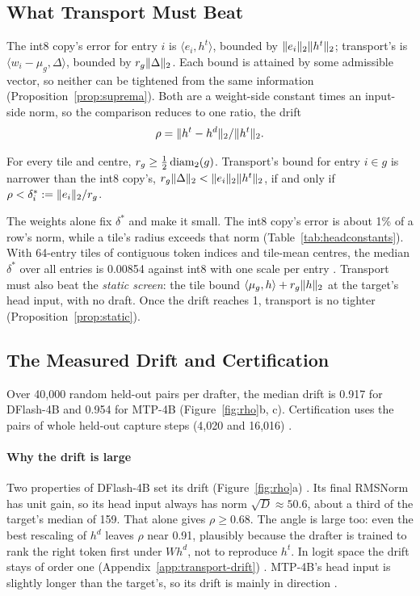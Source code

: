 \subsection{What Transport Must Beat}\label{sec:crossover}\label{sec:geometry}
The int8 copy's error for entry $i$ is $\langle e_i,h^t\rangle$, bounded by $\lVert e_i\rVert_2\lVert h^t\rVert_2$; transport's is $\langle w_i-\mu_g,\Delta\rangle$, bounded by $r_g\lVert \Delta\rVert_2$. Each bound is attained by some admissible vector, so neither can be tightened from the same information (Proposition~\ref{prop:suprema}). Both are a weight-side constant times an input-side norm, so the comparison reduces to one ratio, the drift
\begin{equation}
\rho=\lVert h^t-h^d\rVert_2/\lVert h^t\rVert_2.\label{eq:rho}
\end{equation}

\begin{proposition}[Crossover]\label{thm:crossover}
For every tile and centre, $r_g\ge\tfrac12\operatorname{diam}_2(g)$. Transport's bound for entry $i\in g$ is narrower than the int8 copy's, $r_g\lVert \Delta\rVert_2<\lVert e_i\rVert_2\lVert h^t\rVert_2$, if and only if $\rho<\delta^\ast_i:=\lVert e_i\rVert_2/r_g$.
\end{proposition}

The weights alone fix $\delta^\ast$ and make it small. The int8 copy's error is about 1\% of a row's norm, while a tile's radius exceeds that norm (Table~\ref{tab:headconstants}). With 64-entry tiles of contiguous token indices and tile-mean centres, the median $\delta^\ast$ over all entries is 0.00854 against int8 with one scale per entry . Transport must also beat the \emph{static screen}: the tile bound $\langle\mu_g,h\rangle+r_g\lVert h\rVert_2$ at the target's head input, with no draft. Once the drift reaches 1, transport is no tighter (Proposition~\ref{prop:static}).

\subsection{The Measured Drift and Certification}\label{sec:transport-measured}
Over 40,000 random held-out pairs per drafter, the median drift is 0.917 for DFlash-4B  and 0.954 for MTP-4B  (Figure~\ref{fig:rho}b, c). Certification uses the pairs of whole held-out capture steps (4,020 and 16,016) .

\paragraph{Why the drift is large} Two properties of DFlash-4B set its drift (Figure~\ref{fig:rho}a) . Its final RMSNorm has unit gain, so its head input always has norm $\sqrt D\approx50.6$, about a third of the target's median of 159. That alone gives $\rho\ge0.68$. The angle is large too: even the best rescaling of $h^d$ leaves $\rho$ near 0.91, plausibly because the drafter is trained to rank the right token first under $Wh^d$, not to reproduce $h^t$. In logit space the drift stays of order one (Appendix~\ref{app:transport-drift}) . MTP-4B's head input is slightly longer than the target's, so its drift is mainly in direction .

